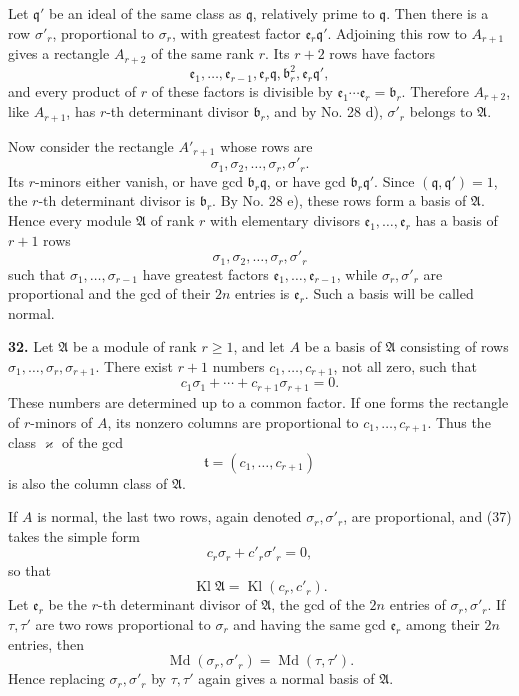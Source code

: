 \documentclass[11pt,a4paper]{article}
\newcommand{\Kl}{\operatorname{Kl}}
\begin{document}
Let \(\mathfrak q'\) be an ideal of the same class as \(\mathfrak q\), relatively prime to \(\mathfrak q\). Then there is a row \(\sigma'_r\), proportional to \(\sigma_r\), with greatest factor \(\mathfrak e_r\mathfrak q'\). Adjoining this row to \(A_{r+1}\) gives a rectangle \(A_{r+2}\) of the same rank \(r\). Its \(r+2\) rows have factors
\[
 \mathfrak e_1,\ldots,\mathfrak e_{r-1},\mathfrak e_r\mathfrak q,
 \mathfrak b_r^2,\mathfrak e_r\mathfrak q',
\]
and every product of \(r\) of these factors is divisible by \(\mathfrak e_1\cdots\mathfrak e_r=\mathfrak b_r\). Therefore \(A_{r+2}\), like \(A_{r+1}\), has \(r\)-th determinant divisor \(\mathfrak b_r\), and by No. 28 d), \(\sigma'_r\) belongs to \(\mathfrak A\).

Now consider the rectangle \(A'_{r+1}\) whose rows are
\[
 \sigma_1,\sigma_2,\ldots,\sigma_r,\sigma'_r .
\]
Its \(r\)-minors either vanish, or have gcd \(\mathfrak b_r\mathfrak q\), or have gcd \(\mathfrak b_r\mathfrak q'\). Since \((\mathfrak q,\mathfrak q')=1\), the \(r\)-th determinant divisor is \(\mathfrak b_r\). By No. 28 e), these rows form a basis of \(\mathfrak A\). Hence every module \(\mathfrak A\) of rank \(r\) with elementary divisors \(\mathfrak e_1,\ldots,\mathfrak e_r\) has a basis of \(r+1\) rows
\[
 \sigma_1,\sigma_2,\ldots,\sigma_r,\sigma'_r
\]
such that \(\sigma_1,\ldots,\sigma_{r-1}\) have greatest factors \(\mathfrak e_1,\ldots,\mathfrak e_{r-1}\), while \(\sigma_r,\sigma'_r\) are proportional and the gcd of their \(2n\) entries is \(\mathfrak e_r\). Such a basis will be called normal.

\textbf{32.} Let \(\mathfrak A\) be a module of rank \(r\ge1\), and let \(A\) be a basis of \(\mathfrak A\) consisting of rows \(\sigma_1,\ldots,\sigma_r,\sigma_{r+1}\). There exist \(r+1\) numbers \(c_1,\ldots,c_{r+1}\), not all zero, such that
\[
 c_1\sigma_1+\cdots+c_{r+1}\sigma_{r+1}=0. \tag{37}
\]
These numbers are determined up to a common factor. If one forms the rectangle of \(r\)-minors of \(A\), its nonzero columns are proportional to \(c_1,\ldots,c_{r+1}\). Thus the class \(\varkappa\) of the gcd
\[
 \mathfrak t=(c_1,\ldots,c_{r+1})
\]
is also the column class of \(\mathfrak A\).

If \(A\) is normal, the last two rows, again denoted \(\sigma_r,\sigma'_r\), are proportional, and (37) takes the simple form
\[
 c_r\sigma_r+c'_r\sigma'_r=0, \tag{38}
\]
so that
\[
 \Kl\mathfrak A=\Kl(c_r,c'_r). \tag{39}
\]
Let \(\mathfrak e_r\) be the \(r\)-th determinant divisor of \(\mathfrak A\), the gcd of the \(2n\) entries of \(\sigma_r,\sigma'_r\). If \(\tau,\tau'\) are two rows proportional to \(\sigma_r\) and having the same gcd \(\mathfrak e_r\) among their \(2n\) entries, then
\[
 \operatorname{Md}(\sigma_r,\sigma'_r)=\operatorname{Md}(\tau,\tau'). \tag{40}
\]
Hence replacing \(\sigma_r,\sigma'_r\) by \(\tau,\tau'\) again gives a normal basis of \(\mathfrak A\).
\end{document}
